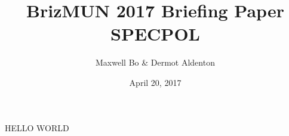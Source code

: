 \documentclass[11pt,a4paper]{report}
\begin{document}
\title{BrizMUN 2017 Briefing Paper \\ SPECPOL}
\author{Maxwell Bo \& Dermot Aldenton}
\date{April 20, 2017}
\maketitle

HELLO WORLD
\end{document}
